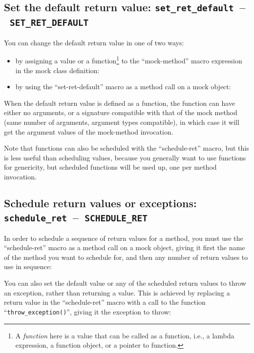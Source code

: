 \documentclass[twoside, a4paper, article]{memoir}
\newcommand*\testudocolor{\color{red!80!blue}}
\newcommand*\testudo[1]{\texttt{\testudocolor{}#1}}
\newcommand*\testudopair[2]{\testudo{#1}~--~\testudo{#2}}
\newcommand\subsectiontestudopair[3]{%
  \subsection[#1]{#1: \testudopair{#2}{#3}}}
\newcommand\typesetexample[1]{%
  \typesetexamplesource{#1}
}
\providecommand\typesetexamplesource[1]{%
}
\begin{document}
\subsectiontestudopair{Set the default return value}%
  {set\_ret\_default}{SET\_RET\_DEFAULT}

You can change the default return value in one of two ways:
\begin{itemize}
\item by assigning a value or a function\footnote{A \emph{function} here is a
    value that can be called as a function, i.e., a lambda expression, a
    function object, or a pointer to function.} to the ``mock-method'' macro
  expression in the mock class definition:

  \typesetexample{mock-class-mock-method-default-return-value-assign}

\item by using the ``set-ret-default'' macro as a method call on a mock object:

  \typesetexample{mock-class-mock-method-default-return-value-set-ret-default}

\end{itemize}

When the default return value is defined as a function, the function can have
either no arguments, or a signature compatible with that of the mock method
(same number of arguments, argument types compatible), in which case it will
get the argument values of the mock-method invocation.

Note that functions can also be scheduled with the ``schedule-ret'' macro, but
this is less useful than scheduling values, because you generally want to use
functions for genericity, but scheduled functions will be used up, one per
method invocation.

\subsectiontestudopair{Schedule return values or exceptions}%
  {schedule\_ret}{SCHEDULE\_RET}

In order to schedule a sequence of return values for a method, you must use the
``schedule-ret'' macro as a method call on a mock object, giving it first the
name of the method you want to schedule for, and then any number of return
values to use in sequence:

\typesetexample{mock-class-mock-method-schedule-ret}

You can also set the default value or any of the scheduled return values to
throw an exception, rather than returning a value.  This is achieved by
replacing a return value in the ``schedule-ret'' macro with a call to the
function ``\texttt{throw\_exception()}'', giving it the exception to throw:

\typesetexample{mock-class-mock-method-schedule-exception}
\end{document}
